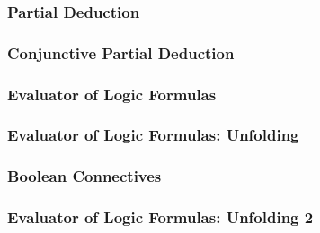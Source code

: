 \documentclass[xcolor=table]{beamer}
\begin{document}
\begin{frame}[fragile]
  \transwipe[direction=90]
  \frametitle{Partial Deduction}

\begin{center}
  
\end{center}

\end{frame}

\begin{frame}[fragile]
  \transwipe[direction=90]
  \frametitle{Conjunctive Partial Deduction}

\begin{center}
  
\end{center}
\end{frame}

\begin{frame}[fragile]
  \transwipe[direction=90]
  \frametitle{Evaluator of Logic Formulas}

\begin{center}
  
\end{center}
\end{frame}

\begin{frame}[fragile]
  \transwipe[direction=90]
  \frametitle{Evaluator of Logic Formulas: Unfolding}

\begin{center}
  
\end{center}
\end{frame}

\begin{frame}[fragile]
  \transwipe[direction=90]
  \frametitle{Boolean Connectives}

\begin{center}
  
\end{center}

\begin{center}
  
\end{center}

\begin{center}
  
\end{center}
\end{frame}

\begin{frame}[fragile]
  \transwipe[direction=90]
  \frametitle{Evaluator of Logic Formulas: Unfolding 2}

\begin{center}
  
\end{center}
\end{frame}
\end{document}
